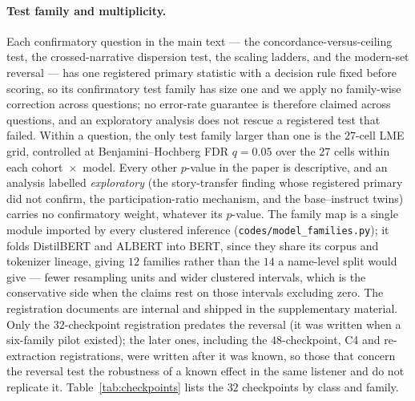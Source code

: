 \documentclass{article}
\begin{document}
\paragraph{Test family and multiplicity.} Each confirmatory question in the main text --- the
concordance-versus-ceiling test, the crossed-narrative dispersion test, the scaling ladders, and
the modern-set reversal --- has one registered primary statistic with a decision rule fixed
before scoring, so its confirmatory test family has size one and we apply no family-wise
correction across questions; no error-rate guarantee is therefore claimed across questions, and an
exploratory analysis does not rescue a registered test that failed. Within a question, the only test family larger than one is the
$27$-cell LME grid, controlled at Benjamini--Hochberg FDR \citep{benjamini1995controlling} $q = 0.05$ over the $27$ cells within
each cohort~$\times$~model. Every other $p$-value in the paper is descriptive, and an analysis
labelled \emph{exploratory} (the story-transfer finding whose registered primary did not
confirm, the participation-ratio mechanism, and the base--instruct twins) carries no
confirmatory weight, whatever its $p$-value. The family map is a single module imported by every
clustered inference (\texttt{codes/model\_families.py}); it folds DistilBERT and ALBERT into
BERT, since they share its corpus and tokenizer lineage, giving $12$ families rather than the
$14$ a name-level split would give --- fewer resampling units and wider clustered intervals,
which is the conservative side when the claims rest on those intervals excluding zero. The
registration documents are internal and shipped in the supplementary material. Only the $32$-checkpoint registration predates the
reversal (it was written when a six-family pilot existed); the later ones, including the
$48$-checkpoint, C4 and re-extraction registrations, were written after it was known, so those that
concern the reversal test the robustness of a known effect in the same listener and do not
replicate it. Table~\ref{tab:checkpoints} lists the $32$ checkpoints by class and family.
\end{document}
